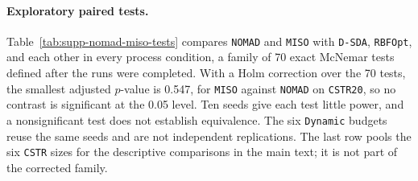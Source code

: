 \paragraph{Exploratory paired tests.}
Table~\ref{tab:supp-nomad-miso-tests} compares \texttt{NOMAD} and \texttt{MISO} with \texttt{D-SDA}, \texttt{RBFOpt}, and each other in every process condition, a family of 70 exact McNemar tests defined after the runs were completed.
With a Holm correction over the 70 tests, the smallest adjusted \(p\)-value is 0.547, for \texttt{MISO} against \texttt{NOMAD} on \texttt{CSTR20}, so no contrast is significant at the 0.05 level.
Ten seeds give each test little power, and a nonsignificant test does not establish equivalence.
The six \texttt{Dynamic} budgets reuse the same seeds and are not independent replications.
The last row pools the six \texttt{CSTR} sizes for the descriptive comparisons in the main text; it is not part of the corrected family.

